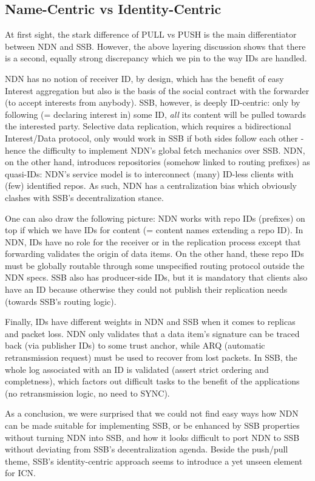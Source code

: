 \documentclass[9pt,sigconf,rewiew]{acmart}
\begin{document}
\subsection{Name-Centric vs Identity-Centric}

At first sight, the stark difference of PULL vs PUSH is the main
differentiator between NDN and SSB. However, the above layering
discussion shows that there is a second, equally strong discrepancy
which we pin to the way IDs are handled.

NDN has no notion of receiver ID, by design, which has the benefit of
easy Interest aggregation but also is the basis of the social contract
with the forwarder (to accept interests from anybody). SSB, however,
is deeply ID-centric: only by following (= declaring interest in) some
ID, {\em all} its content will be pulled towards the interested
party. Selective data replication, which requires a bidirectional
Interest/Data protocol, only would work in SSB if both sides follow
each other - hence the difficulty to implement NDN's global fetch
mechanics over SSB. NDN, on the other hand, introduces repositories
(somehow linked to routing prefixes) as quasi-IDs: NDN's service model
is to interconnect (many) ID-less clients with (few) identified repos.
As such, NDN has a centralization bias which obviously clashes with
SSB's decentralization stance.

One can also draw the following picture: NDN works with repo IDs
(prefixes) on top if which we have IDs for content (= content names
extending a repo ID). In NDN, IDs have no role for the receiver or in
the replication process except that forwarding validates the origin of
data items. On the other hand, these repo IDs must be globally routable
through some unspecified routing protocol outside the NDN specs. SSB
also has producer-side IDs, but it is mandatory that clients also have
an ID because otherwise they could not publish their replication needs
(towards SSB's routing logic).

Finally, IDs have different weights in NDN and SSB when it comes to
replicas and packet loss. NDN only validates that a data item's
signature can be traced back (via publisher IDs) to some trust anchor,
while ARQ (automatic retransmission request) must be used to recover
from lost packets. In SSB, the whole log associated with an ID is
validated (assert strict ordering and completness), which factors out
difficult tasks to the benefit of the applications (no retransmission
logic, no need to SYNC).

As a conclusion, we were surprised that we could not find easy ways
how NDN can be made suitable for implementing SSB, or be enhanced by
SSB properties without turning NDN into SSB, and how it looks
difficult to port NDN to SSB without deviating from SSB's
decentralization agenda. Beside the push/pull theme, SSB's
identity-centric approach seems to introduce a yet unseen element for
ICN.
\end{document}
